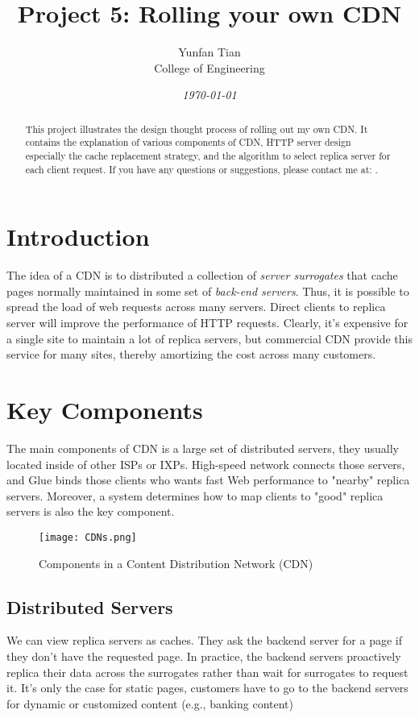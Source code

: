\documentclass{elegantpaper}
\title{Project 5: Rolling your own CDN}
\author{{Yunfan Tian} 
		 \\[0.5ex] %
		College of Engineering}
\date{\small\itshape  \today}
\begin{document}
\maketitle

\begin{abstract}
	This project illustrates the design thought process of rolling out my own CDN. It contains the explanation of various components of CDN, HTTP server design especially the cache replacement strategy, and the algorithm to select replica server for each client request. If you have any questions or suggestions, please contact me at: .
\end{abstract}

\section{Introduction}

The idea of a CDN is to distributed a collection of \textit{server surrogates} that cache pages normally maintained in some set of \textit{back-end servers}. Thus, it is possible to spread the load of web requests across many servers. Direct clients to replica server will improve the performance of HTTP requests. Clearly, it's expensive for a single site to maintain a lot of replica servers, but commercial CDN provide this service for many sites, thereby amortizing the cost across many customers\cite{Peterson}.

\section{Key Components}
The main components of CDN is a large set of distributed servers, they usually  located inside of other ISPs or IXPs. High-speed network connects those servers, and Glue binds those clients who wants fast Web performance to "nearby" replica servers. Moreover, a system determines how to map clients to "good" replica servers is also the key component.
\begin{figure}[!ht]
	\centering
	\texttt{[image: CDNs.png]}
	\caption{Components in a Content Distribution Network (CDN)\label{fig:cdn}}
\end{figure}
\subsection{Distributed Servers}
We can view replica servers as caches. They ask the backend server for a page if they don't have the requested page. In practice,  the backend servers proactively replica their data across the surrogates rather than wait for surrogates to request it. It's only the case for static pages, customers have to go to the backend servers for dynamic or customized content (e.g., banking content)
\end{document}
